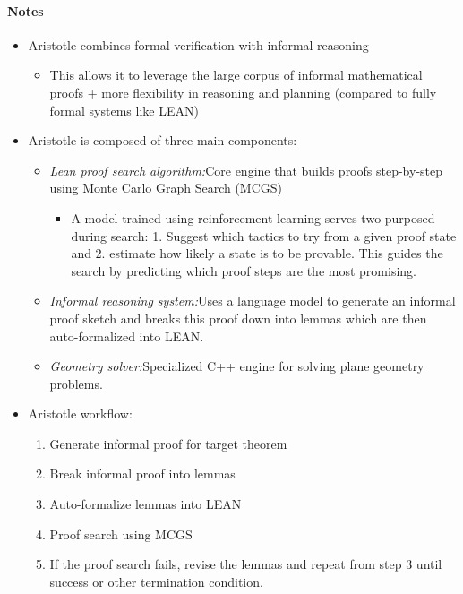 \documentclass[12pt,a4paper,twoside]{article}
\begin{document}
\begin{paper}
	\paragraph{Notes}
	\begin{itemize}
		\item Aristotle combines formal verification with informal reasoning
		      \begin{itemize}
			      \item This allows it to leverage the large corpus of informal mathematical proofs + more flexibility in reasoning and planning (compared to fully formal systems like LEAN)
		      \end{itemize}
		\item Aristotle is composed of three main components:
		      \begin{itemize}
			      \item \textit{Lean proof search algorithm:}\quad Core engine that builds proofs step-by-step using Monte Carlo Graph Search (MCGS)
			            \begin{itemize}
				            \item A model trained using reinforcement learning serves two purposed during search: 1. Suggest which tactics to try from a given proof state and 2. estimate how likely a state is to be provable. This guides the search by predicting which proof steps are the most promising.
			            \end{itemize}
			      \item \textit{Informal reasoning system:}\quad Uses a language model to generate an informal proof sketch and breaks this proof down into lemmas which are then auto-formalized into LEAN.
			      \item \textit{Geometry solver:}\quad Specialized C++ engine for solving plane geometry problems.
		      \end{itemize}
		\item Aristotle workflow:
		      \begin{enumerate}
			      \item Generate informal proof for target theorem
			      \item Break informal proof into lemmas
			      \item Auto-formalize lemmas into LEAN
			      \item Proof search using MCGS
			      \item If the proof search fails, revise the lemmas and repeat from step 3 until success or other termination condition.
		      \end{enumerate}
	\end{itemize}


\end{paper}
\end{document}
